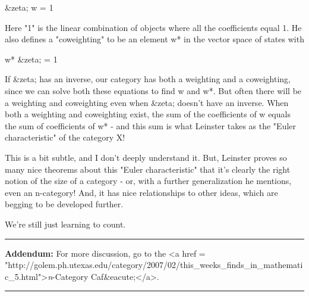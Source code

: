&zeta; w = 1

Here "1" is the linear combination of objects where all the
coefficients equal 1.  He also defines a "coweighting" to be
an element w* in the vector space of states with

w* &zeta; = 1

If &zeta; has an inverse, our category has both a weighting and a
coweighting, since we can solve both these equations to find w and w*.
But often there will be a weighting and coweighting even when &zeta;
doesn't have an inverse.  When both a weighting and coweighting exist,
the sum of the coefficients of w equals the sum of coefficients of w*
- and this sum is what Leinster takes as the "Euler
characteristic" of the category X!

This is a bit subtle, and I don't deeply understand it.  But, Leinster
proves so many nice theorems about this "Euler characteristic" that 
it's clearly the right notion of the size of a category - or, with a
further generalization he mentions, even an n-category!  And, it has 
nice relationships to other ideas, which are begging to be developed
further.

We're still just learning to count.

\par\noindent\rule{\textwidth}{0.4pt}
\textbf{Addendum:} For more discussion, go to the <a href = "http://golem.ph.utexas.edu/category/2007/02/this_weeks_finds_in_mathematic_5.html">\emph{n}-Category
Caf&eacute;</a>.





\par\noindent\rule{\textwidth}{0.4pt}


